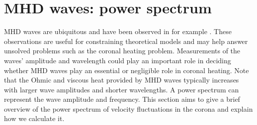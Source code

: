 \section{MHD waves: power spectrum}
\label{sec:mhd_waves_power_spectrum}

MHD waves are ubiquitous and have been observed in for example \citet{Tomczyk2007,McIntosh2011,DeMoortel2012}. These observations are useful for constraining theoretical models and may help answer unsolved problems such as the coronal heating problem. Measurements of the waves' amplitude and wavelength could play an important role in deciding whether MHD waves play an essential or negligible role in coronal heating. Note that the Ohmic and viscous heat provided by MHD waves typically increases with larger wave amplitudes and shorter wavelengths.  A power spectrum can represent the wave amplitude and frequency. This section aims to give a brief overview of the power spectrum of velocity fluctuations in the corona and explain how we calculate it.


